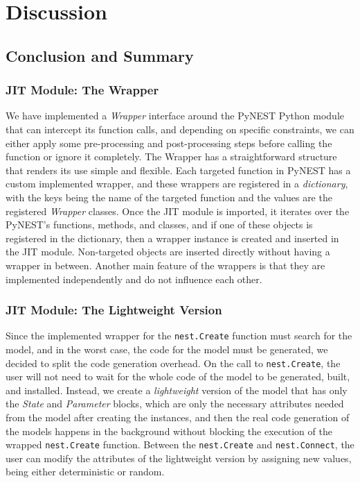 \chapter{Discussion}
 \label{chap:disc}
\section{Conclusion and Summary}

\subsection*{JIT Module: The Wrapper}

We have implemented a \emph{Wrapper} interface around the PyNEST Python module that can intercept its function calls, and depending on specific constraints, we can either apply some pre-processing and post-processing steps before calling the function or ignore it completely. The Wrapper has a straightforward structure that renders its use simple and flexible. Each targeted function in PyNEST has a custom implemented wrapper, and these wrappers are registered in a \emph{dictionary}, with the keys being the name of the targeted function and the values are the registered \emph{Wrapper} classes. Once the JIT module is imported, it iterates over the PyNEST's functions, methods, and classes, and if one of these objects is registered in the dictionary, then a wrapper instance is created and inserted in the JIT module. Non-targeted objects are inserted directly without having a wrapper in between. Another main feature of the wrappers is that they are implemented independently and do not influence each other.

\subsection*{JIT Module: The Lightweight Version}

Since the implemented wrapper for the \texttt{nest.Create} function must search for the model, and in the worst case, the code for the model must be generated, we decided to split the code generation overhead. On the call to \texttt{nest.Create}, the user will not need to wait for the whole code of the model to be generated, built, and installed. Instead, we create a \emph{lightweight} version of the model that has only the \emph{State} and \emph{Parameter} blocks, which are only the necessary attributes needed from the model after creating the instances, and then the real code generation of the models happens in the background without blocking the execution of the wrapped \texttt{nest.Create} function. Between the \texttt{nest.Create} and \texttt{nest.Connect}, the user can modify the attributes of the lightweight version by assigning new values, being either deterministic or random.



